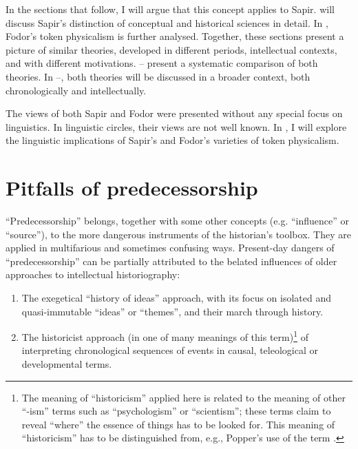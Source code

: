 \documentclass[output=paper]{langscibook}
\begin{document}
In the sections that follow, I will argue that this concept applies to Sapir.  will discuss Sapir's distinction of conceptual and historical sciences in detail. In , Fodor's token physicalism is further analysed. Together, these sections present a picture of similar theories, developed in different periods, intellectual contexts, and with different motivations. -- present a systematic comparison of both theories. In --, both theories will be discussed in a broader context, both chronologically and intellectually. 

The views of both Sapir and Fodor were presented without any special focus on linguistics. In linguistic circles, their views are not well known. In , I will explore the linguistic implications of Sapir's and Fodor's varieties of token physicalism.

\section{Pitfalls of predecessorship}
\label{sec:elffers:pitfalls}

``Predecessorship'' belongs, together with some other concepts (e.g. ``influence'' or ``source''), to the more dangerous instruments of the historian's toolbox. They are applied in multifarious and sometimes confusing ways. Present-day dangers of ``predecessorship'' can be partially attributed to the belated influences of older approaches to intellectual historiography:

\begin{enumerate}
    \item The exegetical ``history of ideas'' approach, with its focus on isolated and quasi-immutable ``ideas'' or ``themes'', and their march through history.
    \item The historicist approach (in one of many meanings of this term)\footnote{The meaning of ``historicism'' applied here is related to the meaning of other ``-ism'' terms such as ``psychologism'' or ``scientism''; these terms claim to reveal ``where'' the essence of things has to be looked for. This meaning of ``historicism'' has to be distinguished from, e.g., Popper's use of the term \citep[cf.][43]{Elffers1991}.} of interpreting chronological sequences of events in causal, teleological or developmental terms.
\end{enumerate}
\end{document}
